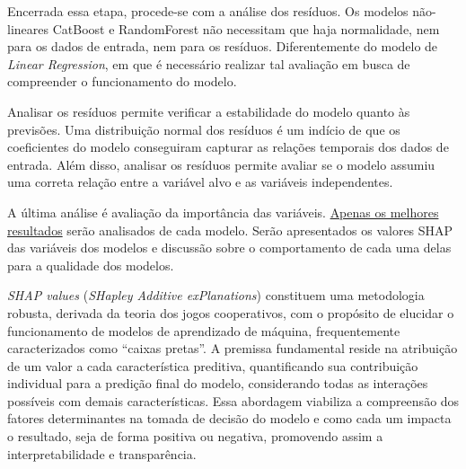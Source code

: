 
Encerrada essa etapa, procede-se com a análise dos resíduos. Os modelos não-lineares CatBoost e RandomForest não necessitam que haja normalidade, nem para os dados de entrada, nem para os resíduos. Diferentemente do modelo de \textit{Linear Regression}, em que é necessário realizar tal avaliação em busca de compreender o funcionamento do modelo.

Analisar os resíduos permite verificar a estabilidade do modelo quanto às previsões. Uma distribuição normal dos resíduos é um indício de que os coeficientes do modelo conseguiram capturar as relações temporais dos dados de entrada. Além disso, analisar os resíduos permite avaliar se o modelo assumiu uma correta relação entre a variável alvo e as variáveis independentes.\cite{belloto1985residual}


A última análise é avaliação da importância das variáveis. \underline{Apenas os melhores resultados} serão analisados de cada modelo. Serão apresentados os valores SHAP das variáveis dos modelos e discussão sobre o comportamento de cada uma delas para a qualidade dos modelos.

\textit{SHAP values} (\textit{SHapley Additive exPlanations}) constituem uma metodologia robusta, derivada da teoria dos jogos cooperativos, com o propósito de elucidar o funcionamento de modelos de aprendizado de máquina, frequentemente caracterizados como ``caixas pretas''. A premissa fundamental reside na atribuição de um valor a cada característica preditiva, quantificando sua contribuição individual para a predição final do modelo, considerando todas as interações possíveis com demais características. Essa abordagem viabiliza a compreensão dos fatores determinantes na tomada de decisão do modelo e como cada um impacta o resultado, seja de forma positiva ou negativa, promovendo assim a interpretabilidade e transparência.\cite{merrick_taly_2020}

